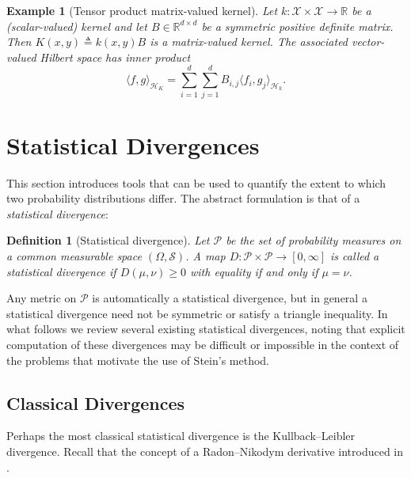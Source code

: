 \documentclass[12pt,paper=letter]{scrreprt}
\newtheorem{definition}{Definition}[chapter]
\newtheorem{example}{Example}[chapter]
\def\defeq{\triangleq} %
\begin{document}
\begin{example}[Tensor product matrix-valued kernel]
    Let $k : \mathcal{X} \times \mathcal{X} \rightarrow \mathbb{R}$ be a (scalar-valued) kernel and let $B \in \mathbb{R}^{d \times d}$ be a symmetric positive definite matrix.
    Then $K(x,y) \defeq  k(x,y) B$ is a matrix-valued kernel.
    The associated vector-valued Hilbert space has inner product
    $$
    \langle f , g \rangle_{\mathcal{H}_K} = \sum_{i=1}^d \sum_{j=1}^d B_{i,j} \langle f_i , g_j \rangle_{\mathcal{H}_k}.
    $$
\end{example}








\section{Statistical Divergences}
\label{sec: divergences}

This section introduces tools that can be used to quantify the extent to which two probability distributions differ.
The abstract formulation is that of a \emph{statistical divergence}:

\begin{definition}[Statistical divergence]
\label{def: divergence}
    Let $\mathcal{P}$ be the set of probability measures on a common measurable space $(\Omega,\mathcal{S})$.
    A map $D : \mathcal{P} \times \mathcal{P} \rightarrow [0,\infty]$ is called a \emph{statistical divergence} if $D(\mu,\nu) \geq 0$ with equality if and only if $\mu = \nu$.
\end{definition}

Any metric on $\mathcal{P}$ is automatically a statistical divergence, but in general a statistical divergence need not be symmetric or satisfy a triangle inequality.
In what follows we review several existing statistical divergences, noting that explicit computation of these divergences may be difficult or impossible in the context of the problems that motivate the use of Stein's method.


\subsection{Classical Divergences}

Perhaps the most classical statistical divergence is the Kullback--Leibler divergence.
Recall that the concept of a Radon--Nikodym derivative introduced in .
\end{document}
